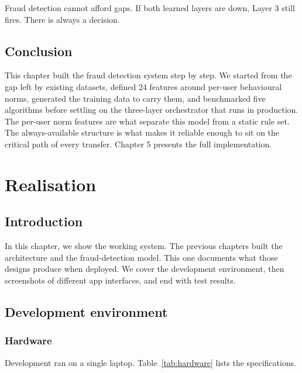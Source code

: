 \documentclass[12pt,a4paper]{report}
\begin{document}
Fraud detection cannot afford gaps. If both learned layers are down, Layer 3 still fires. There
is always a decision.

\section{Conclusion}

This chapter built the fraud detection system step by step. We started from the gap left by
existing datasets, defined 24 features around per-user behavioural norms, generated the training
data to carry them, and benchmarked five algorithms before settling on the three-layer
orchestrator that runs in production. The per-user norm features are what separate this model
from a static rule set. The always-available structure is what makes it reliable enough to sit
on the critical path of every transfer. Chapter 5 presents the full implementation.

\chapter{Realisation}
\label{chap:realization}

\section{Introduction}

In this chapter, we show the working system. The previous chapters built the architecture and
the fraud-detection model. This one documents what those designs produce when deployed. We
cover the development environment, then screenshots of different app interfaces, and end with
test results.

\section{Development environment}

\subsection{Hardware}

Development ran on a single laptop. Table~\ref{tab:hardware} lists the specifications.
\end{document}
